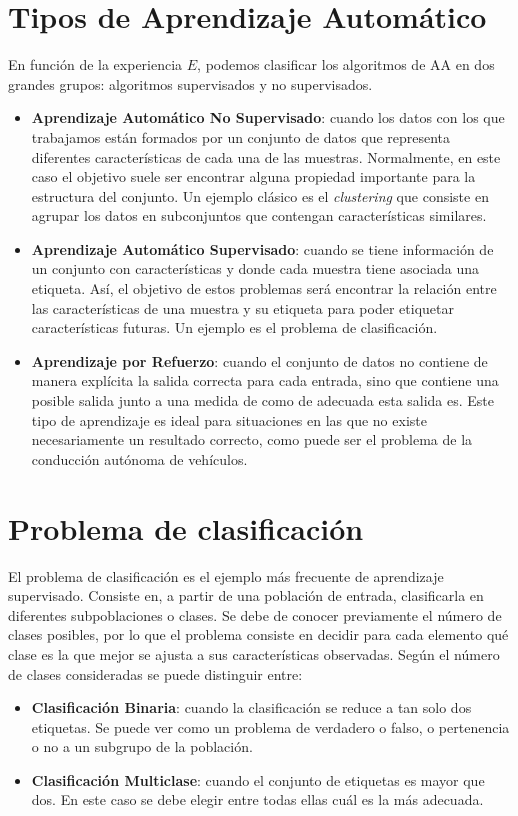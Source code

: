 \section{Tipos de Aprendizaje Automático}
En función de la experiencia $E$, podemos clasificar los algoritmos de \ac{AA} en dos grandes grupos: algoritmos supervisados y no supervisados.
\begin{itemize}
    \item \textbf{Aprendizaje Automático No Supervisado}: cuando los datos con los que trabajamos están formados por un conjunto de datos que representa diferentes características de cada una de las muestras. Normalmente, en este caso el objetivo suele ser encontrar alguna propiedad importante para la estructura del conjunto. Un ejemplo clásico es el \textit{clustering} que consiste en agrupar los datos en subconjuntos que contengan características similares.
    \item \textbf{Aprendizaje Automático Supervisado}: cuando se tiene información de un conjunto con características y donde cada muestra tiene asociada una etiqueta. Así, el objetivo de estos problemas será encontrar la relación entre las características de una muestra y su etiqueta para poder etiquetar características futuras. Un ejemplo es el problema de clasificación.
    \item \textbf{Aprendizaje por Refuerzo}: cuando el conjunto de datos no contiene de manera explícita la salida correcta para cada entrada, sino que contiene una posible salida junto a una medida de como de adecuada esta salida es. Este tipo de aprendizaje es ideal para situaciones en las que no existe necesariamente un resultado correcto, como puede ser el problema de la conducción autónoma de vehículos.
\end{itemize}

\section{Problema de clasificación}

El problema de clasificación es el ejemplo más frecuente de aprendizaje supervisado. Consiste en, a partir de una población de entrada, clasificarla en diferentes subpoblaciones o clases. Se debe de conocer previamente el número de clases posibles, por lo que el problema consiste en decidir para cada elemento qué clase es la que mejor se ajusta a sus características observadas. Según el número de clases consideradas se puede distinguir entre:
\begin{itemize}
    \item \textbf{Clasificación Binaria}: cuando la clasificación se reduce a tan solo dos etiquetas. Se puede ver como un problema de verdadero o falso, o pertenencia o no a un subgrupo de la población.
    \item \textbf{Clasificación Multiclase}: cuando el conjunto de etiquetas es mayor que dos. En este caso se debe elegir entre todas ellas cuál es la más adecuada.
\end{itemize}

